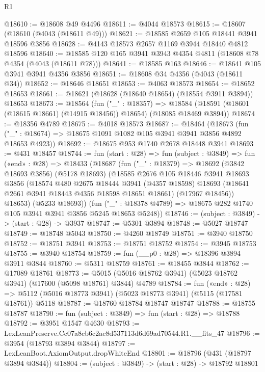 \begin{lexlean}{R1}
\begin{coremodule}
@18610 := @18608 @49 @4496
@18611 := @4044 @18573
@18615 := @18607 (@18610 (@4043 (@18611 @49)))
@18621 := @18585 @2659 @105 @18441 @3941 @18596 @3856
@18628 := @4143 @18573 @2657 @1169 @3944 @18440 @4812 @18596
@18640 := @18585 @120 @165 @3941 @3943 @4354 @4811 (@18608 @78 @4354 (@4043 (@18611 @78)))
@18641 := @18585 @163
@18646 := @18641 @105 @3941 @3941 @4356 @3856
@18651 := @18608 @34 @4356 (@4043 (@18611 @34))
@18652 := @18646 @18651
@18653 := @4063 @18573
@18654 := @18652 @18653
@18661 := @18621 (@18628 (@18640 @18654) (@18554 @3911 @3894)) @18653
@18673 := @18564
    (fun ("_" : @18357) =>
    @18584 (@18591 (@18601 (@18615 @18661) (@14915 @18456)) @18654) (@18085 @18469 @3894))
@18674 := @18356 @4789
@18675 := @4018 @18573
@18687 := @18464
    (@18673 (fun ("_" : @18674) => @18675 @1091 @1082 @105 @3941 @3941 @3856 @4892 @18653 @4923))
@18692 := @18675 @953 @1740 @2678 @18448 @3941
@18693 := @431 @18457
@18744 := fun (start : @28) =>
  fun (subject : @3849) =>
  fun («end» : @28) =>
  @18433
    (@18687
      (fun ("_" : @18379) =>
      @18692
        (@3842 @18693 @3856)
        (@5178 @18693)
        (@18585
          @2676
          @105
          @18446
          @3941
          @18693
          @3856
          (@18574
            @480
            @2675
            @18444
            @3941
            (@4357 @18598)
            @18693
            (@18641 @2661 @3941 @18443 @4356 @18598 @18651 @18661)
            (@17967 @18456))
          @18653)
        (@5233 @18693))
      (fun ("_" : @18378 @4789) => @18675 @282 @1740 @105 @3941 @3941 @3856 @5245 @18653 @5248))
@18746 := (subject : @3849) -> (start : @28) -> @3937
@18747 := @5301 @3894
@18748 := @5027 @18747
@18749 := @18748 @5043
@18750 := @4260 @18749
@18751 := @3940 @18750
@18752 := @18751 @3941
@18753 := @18751 @18752
@18754 := @3945 @18753
@18755 := @3940 @18754
@18759 := fun (__p0 : @28) => @18396 @3894 @3911 @3844
@18760 := @5311 @18759
@18761 := @18455 @3844
@18762 := @17089 @18761
@18773 := @5015 (@5016 @18762 @3941) (@5023 @18762 @3941) (@17600 (@5098 @18761) @3844) @4789
@18784 := fun («end» : @28) =>
  @5112 (@5016 @18773 @3941) (@5023 @18773 @3941) (@5115 (@17581 @18761)) @5118
@18787 := @18760 @18784 @18747 @18747
@18788 := @18755 @18787
@18790 := fun (subject : @3849) => fun (start : @28) => @18788
@18792 := @3951 @1547 @4630
@18793 := LexLeanPreserve.Cc07a8cb6c2ac8d537113d6d69ad70544.R1.__fits_47
@18796 := @3954 (@18793 @3894 @3844)
@18797 := LexLeanBoot.AxiomOutput.dropWhiteEnd
@18801 := @18796 (@431 (@18797 @3894 @3844))
@18804 := (subject : @3849) -> (start : @28) -> @18792 @18801

\end{coremodule}
\end{lexlean}
